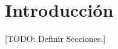 \documentclass{subfiles}
\begin{document}
  \chapter{Introducción}
  \label{chap:introduction}

    [TODO: Definir Secciones.]
\end{document}
